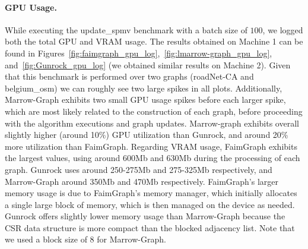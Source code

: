 


\paragraph{\textbf{GPU Usage}.} While executing the update\_spmv benchmark with a batch size of $100$, we logged both the total \gls{GPU} and \gls{VRAM} usage. The results obtained on Machine 1 can be found in Figures~\ref{fig:faimgraph_gpu_log},~\ref{fig:lmarrow-graph_gpu_log}, and~\ref{fig:Gunrock_gpu_log} (we obtained similar results on Machine 2). Given that this benchmark is performed over two graphs (roadNet-CA and belgium\_osm) we can roughly see two large spikes in all plots. Additionally, Marrow-Graph exhibits two small \gls{GPU} usage spikes before each larger spike, which are most likely related to the construction of each graph, before proceeding with the algorithm executions and graph updates. Marrow-graph exhibits overall slightly higher (around 10\%) \gls{GPU} utilization than Gunrock, and around 20\% more utilization than FaimGraph. Regarding \gls{VRAM} usage, FaimGraph exhibits the largest values, using around 600Mb and 630Mb during the processing of each graph. Gunrock uses around 250-275Mb and 275-325Mb respectively, and Marrow-Graph around 350Mb and 470Mb respectively. FaimGraph's larger memory usage is due to FaimGraph's memory manager, which initially allocates a single large block of memory, which is then managed on the device as needed. Gunrock offers slightly lower memory usage than Marrow-Graph because the \gls{CSR} data structure is more compact than the blocked adjacency list. Note that we used a block size of 8 for Marrow-Graph. 


